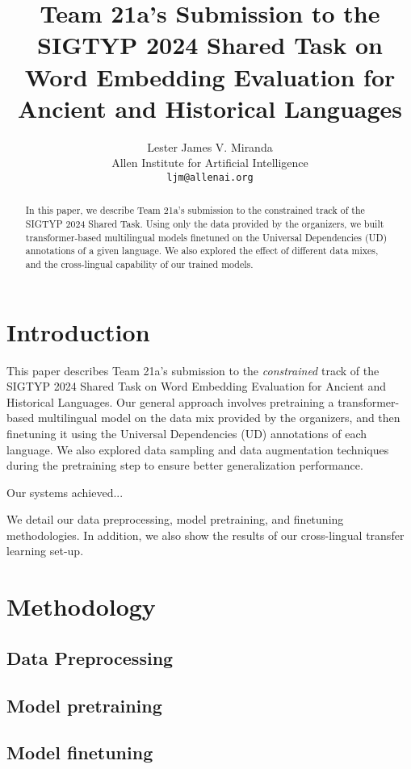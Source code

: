 \documentclass[11pt]{article}
\title{Team 21a's Submission to the SIGTYP 2024 Shared Task on Word Embedding Evaluation for Ancient and Historical Languages}
\author{Lester James V. Miranda \\
  Allen Institute for Artificial Intelligence \\
  \texttt{ljm@allenai.org} \\
}
\begin{document}
\maketitle

\begin{abstract}
In this paper, we describe Team 21a's submission to the constrained track of the SIGTYP 2024 Shared Task.
Using only the data provided by the organizers, we built transformer-based multilingual models finetuned on the Universal Dependencies (UD) annotations of a given language.
We also explored the effect of different data mixes, and the cross-lingual capability of our trained models.
\end{abstract}

\section{Introduction}
This paper describes Team 21a's submission to the \textit{constrained} track of the SIGTYP 2024 Shared Task on Word Embedding Evaluation for Ancient and Historical Languages.
Our general approach involves pretraining a transformer-based multilingual model on the data mix provided by the organizers, and then finetuning it using the Universal Dependencies (UD) annotations of each language.
We also explored data sampling and data augmentation techniques during the pretraining step to ensure better generalization performance.

Our systems achieved...

We detail our data preprocessing, model pretraining, and finetuning methodologies.
In addition, we also show the results of our cross-lingual transfer learning set-up.

\section{Methodology}


\subsection{Data Preprocessing}


\subsection{Model pretraining}


\subsection{Model finetuning}
\end{document}
